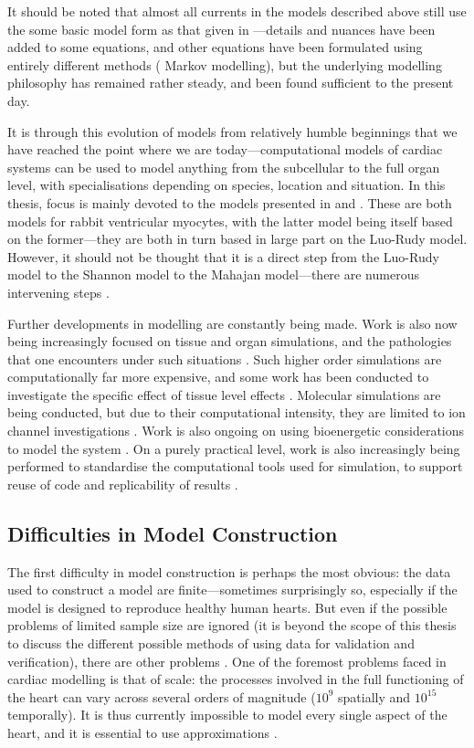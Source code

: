 \documentclass[../thesis-main.tex]{subfiles}
\begin{document}
 It should be noted that almost all currents in the models described above still use the some basic model form as that given in \citet{Hodgkin1952}---details and nuances have been added to some equations, and other equations have been formulated using entirely different methods (\eg{} Markov modelling), but the underlying modelling philosophy has remained rather steady, and been found sufficient to the present day.
 
 It is through this evolution of models from relatively humble beginnings that we have reached the point where we are today---computational models of cardiac systems can be used to model anything from the subcellular to the full organ level, with specialisations depending on species, location and situation. In this thesis, focus is mainly devoted to the models presented in \citet{Shannon2004} and \citet{Mahajan2008}. These are both models for rabbit ventricular myocytes, with the latter model being itself based on the former---they are both in turn based in large part on the Luo-Rudy model. However, it should not be thought that it is a direct step from the Luo-Rudy model to the Shannon model to the Mahajan model---there are numerous intervening steps \citep{Zeng1995, Puglisi2001, Bassani2004}.
 
 Further developments in modelling are constantly being made. Work is also now being increasingly focused on tissue and organ simulations, and the pathologies that one encounters under such situations \citep{PittFrancis2009, Arevalo2007}. Such higher order simulations are computationally far more expensive, and some work has been conducted to investigate the specific effect of tissue level effects \citep{Viswanathan2000}. Molecular simulations are being conducted, but due to their computational intensity, they are limited to ion channel investigations \citep{Nekouzadeh2011}. Work is also ongoing on using bioenergetic considerations to model the system \citep{Niederer2013}. On a purely practical level, work is also increasingly being performed to standardise the computational tools used for simulation, to support reuse of code and replicability of results \citep{PittFrancis2009, Mirams2013}.
 
 \subsection{Difficulties in Model Construction}
 \label{subsec:model-difficulties}
 The first difficulty in model construction is perhaps the most obvious: the data used to construct a model are finite---sometimes surprisingly so, especially if the model is designed to reproduce healthy human hearts. But even if the possible problems of limited sample size are ignored (it is beyond the scope of this thesis to discuss the different possible methods of using data for validation and verification), there are other problems \citep{Marder2011}. One of the foremost problems faced in cardiac modelling is that of scale: the processes involved in the full functioning of the heart can vary across several orders of magnitude ($10^9$ spatially and $10^15$ temporally). It is thus currently impossible to model every single aspect of the heart, and it is essential to use approximations \citep{Abramson2010}.
 
\end{document}
